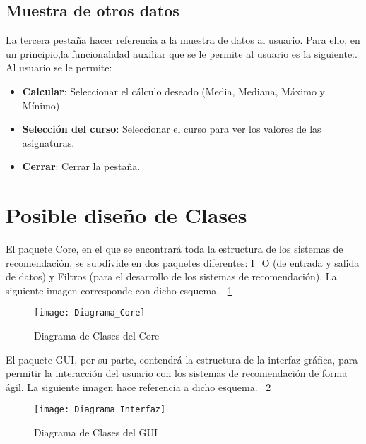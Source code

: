 \subsection{Muestra de otros datos}
La tercera pestaña hacer referencia  a la muestra de datos al usuario. Para ello, en un principio,la  funcionalidad auxiliar que se le permite al  usuario es la siguiente:.
Al usuario se le permite: 
\begin{itemize}
\item \textbf{Calcular}: Seleccionar el cálculo deseado (Media, Mediana, Máximo y Mínimo)
\item\textbf{Selección del curso}: Seleccionar el curso para ver los valores de las asignaturas. 
\item \textbf{Cerrar}: Cerrar la pestaña. 
\end{itemize}

\section{Posible diseño de Clases} 
El paquete Core,  en el que se encontrará toda la estructura de los sistemas de recomendación, se subdivide en dos paquetes diferentes: I\_O (de entrada y salida de datos) y Filtros (para el desarrollo de los sistemas de recomendación). La siguiente imagen corresponde con dicho esquema. 
 ~\ref{fig:C.3.5}
\begin{figure}[h]
\centering
\texttt{[image: Diagrama\_Core]}
\caption{Diagrama de Clases del Core}
\label{fig:C.3.5}
\end{figure}
El paquete GUI, por su parte, contendrá la estructura de la interfaz gráfica, para permitir la interacción del usuario con los sistemas de recomendación de forma ágil. La siguiente imagen hace referencia a dicho esquema.  ~\ref{fig:C.3.6}
\begin{figure}[h]
\centering
\texttt{[image: Diagrama\_Interfaz]}
\caption{Diagrama de Clases del GUI}
\label{fig:C.3.6}
\end{figure}
